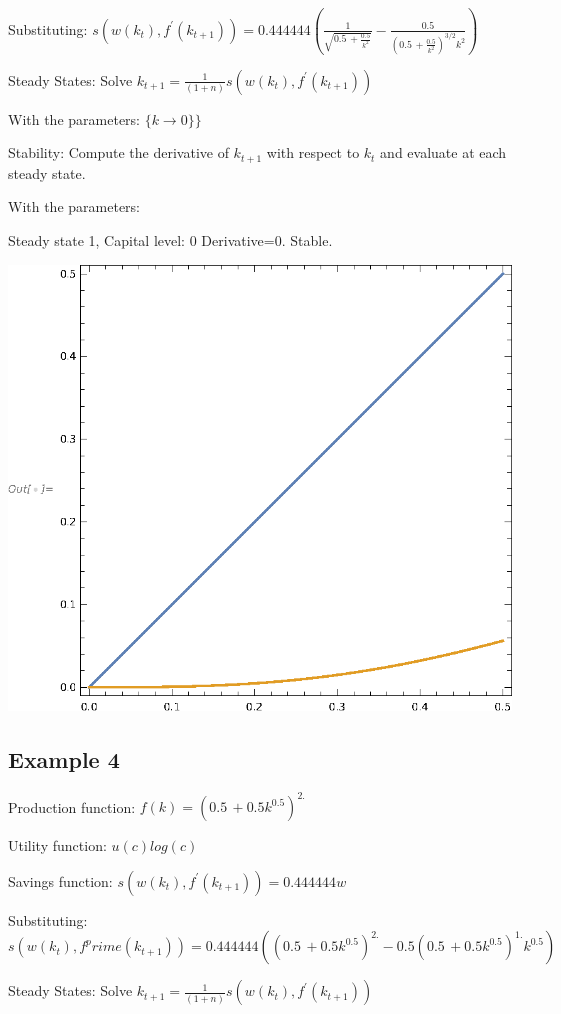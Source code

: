 \documentclass[11pt, a4paper]{article}
\begin{document}
Substituting: $s(w(k_t),f^\prime(k_{t+1}))= 0.444444 \left(\frac{1}{\sqrt{0.5\, +\frac{0.5}{k^2}}}-\frac{0.5}{\left(0.5\, +\frac{0.5}{k^2}\right)^{3/2} k^2}\right)$

Steady States:          Solve ${k}_{t+1}= \frac{1}{(1+n)}s(w(k_t),f^\prime(k_{t+1}))$

With the parameters: $\{k\to 0\}\}$

Stability:             Compute the derivative of $k_{t+1}$ with respect to $k_{t}$ and evaluate at each steady state.

With the parameters:

\quad Steady state 1, Capital level: $0$ Derivative=$0$. Stable.

\includegraphics{xamples_gr3.eps}

\subsection*{Example 4}
Production function:    $f(k)=\left(0.5\, +0.5 k^{0.5}\right)^{2.}$

Utility function:       $u(c)log(c)$

Savings function:       $s(w(k_t),f^\prime(k_{t+1}))= 0.444444 w$

Substituting: $s(w(k_t),f^prime(k_{t+1}))= 0.444444 \left(\left(0.5\, +0.5 k^{0.5}\right)^{2.}-0.5 \left(0.5\, +0.5 k^{0.5}\right)^{1.} k^{0.5}\right)$

Steady States:          Solve ${k}_{t+1}= \frac{1}{(1+n)}s(w(k_t),f^\prime(k_{t+1}))$
\end{document}
